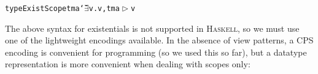 \documentclass[9pt,preprint,authoryear]{sigplanconf}
\begin{document}
{{{}\vphantom{$\{$}}}\textcolor[cmyk]{0,0.65,0.99,0}{\texttt{type}}\textcolor[rgb]{0,0,0.80}{\texttt{\mbox{\hspace{0.50em}}}}\textcolor[rgb]{0,0,0.80}{\texttt{ExistScope}}\textcolor[rgb]{0,0,0.80}{\texttt{\mbox{\hspace{0.50em}}}}\textcolor[rgb]{0,0,0.80}{\texttt{tm}}\textcolor[rgb]{0,0,0.80}{\texttt{\mbox{\hspace{0.50em}}}}\textcolor[rgb]{0,0,0.80}{\texttt{a}}\textcolor[rgb]{0,0,0.80}{\texttt{\mbox{\hspace{0.50em}}}}\textcolor[cmyk]{0,0.65,0.99,0}{\texttt{{\char `\=}}}\textcolor[rgb]{0,0,0.80}{\texttt{\mbox{\hspace{0.50em}}}}\textcolor[cmyk]{0,0.65,0.99,0}{\texttt{$ \exists $}}\textcolor[rgb]{0,0,0.80}{\texttt{\mbox{\hspace{0.50em}}}}\textcolor[rgb]{0,0,0.80}{\texttt{v}}\textcolor[cmyk]{0,0.65,0.99,0}{\texttt{.}}\textcolor[rgb]{0,0,0.80}{\texttt{\mbox{\hspace{0.50em}}}}\textcolor[cmyk]{0,0.65,0.99,0}{\texttt{\makebox[1.22ex][l]{$ {(} $}}}\textcolor[rgb]{0,0,0.80}{\texttt{v}}\textcolor[rgb]{0,0,0.80}{\texttt{\mbox{\hspace{0.50em}}}}\textcolor[cmyk]{0,0.65,0.99,0}{\texttt{,}}\textcolor[rgb]{0,0,0.80}{\texttt{\mbox{\hspace{0.50em}}}}\textcolor[rgb]{0,0,0.80}{\texttt{\mbox{\hspace{0.50em}}}}\textcolor[rgb]{0,0,0.80}{\texttt{tm}}\textcolor[rgb]{0,0,0.80}{\texttt{\mbox{\hspace{0.50em}}}}\textcolor[cmyk]{0,0.65,0.99,0}{\texttt{\makebox[1.22ex][l]{$ {(} $}}}\textcolor[rgb]{0,0,0.80}{\texttt{a}}\textcolor[rgb]{0,0,0.80}{\texttt{\mbox{\hspace{0.50em}}}}\textcolor[rgb]{0,0,0.80}{\texttt{$ \vartriangleright $}}\textcolor[rgb]{0,0,0.80}{\texttt{\mbox{\hspace{0.50em}}}}\textcolor[rgb]{0,0,0.80}{\texttt{v}}\textcolor[cmyk]{0,0.65,0.99,0}{\texttt{\makebox[1.22ex][r]{$ {)} $}}}\textcolor[cmyk]{0,0.65,0.99,0}{\texttt{\makebox[1.22ex][r]{$ {)} $}}}\textcolor[rgb]{0,0,0.80}{\texttt{{\nopagebreak \newline%
}\vphantom{$\{$}}}%


%
%


%
The above syntax for existentials is not supported in \textsc{Haskell}, so we must use
    one of the lightweight encodings available. In the absence of view patterns,   
    a CPS encoding is
    convenient for programming (so we used this so far),
    but a datatype representation is more convenient when dealing with scopes only{:}%
\end{document}
